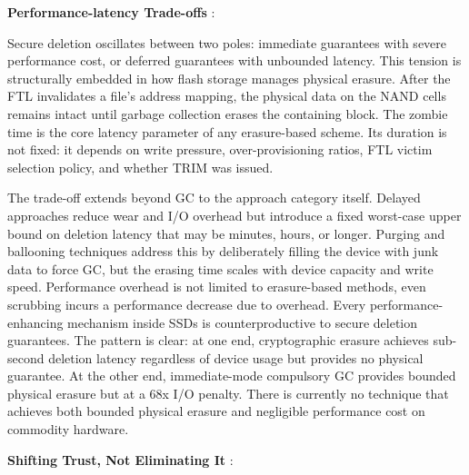 \textbf{Performance-latency Trade-offs} : 

Secure deletion oscillates between two poles: immediate guarantees with severe performance cost, 
or deferred guarantees with unbounded latency. This tension is structurally embedded in how flash 
storage manages physical erasure. After the FTL invalidates a file's address mapping, the physical 
data on the NAND cells remains intact until garbage collection erases the containing block. The 
zombie time is the core latency parameter of any erasure-based scheme. Its duration is not fixed: 
it depends on write pressure, over-provisioning ratios, FTL victim selection policy, and whether 
TRIM was issued.

The trade-off extends beyond GC to the approach category itself. Delayed approaches reduce wear 
and I/O overhead but introduce a fixed worst-case upper bound on deletion latency that may be 
minutes, hours, or longer. Purging and ballooning techniques address this by deliberately filling 
the device with junk data to force GC, but the erasing time scales with device capacity and write 
speed. Performance overhead is not limited to erasure-based methods, even scrubbing incurs a 
performance decrease due to overhead. Every performance-enhancing mechanism inside SSDs is 
counterproductive to secure deletion guarantees. The pattern is clear: at one end, cryptographic 
erasure achieves sub-second deletion latency regardless of device usage but provides no physical 
guarantee. At the other end, immediate-mode compulsory GC provides bounded physical erasure but 
at a 68x I/O penalty. There is currently no technique that achieves both bounded physical erasure 
and negligible performance cost on commodity hardware.

\textbf{Shifting Trust, Not Eliminating It} :  

